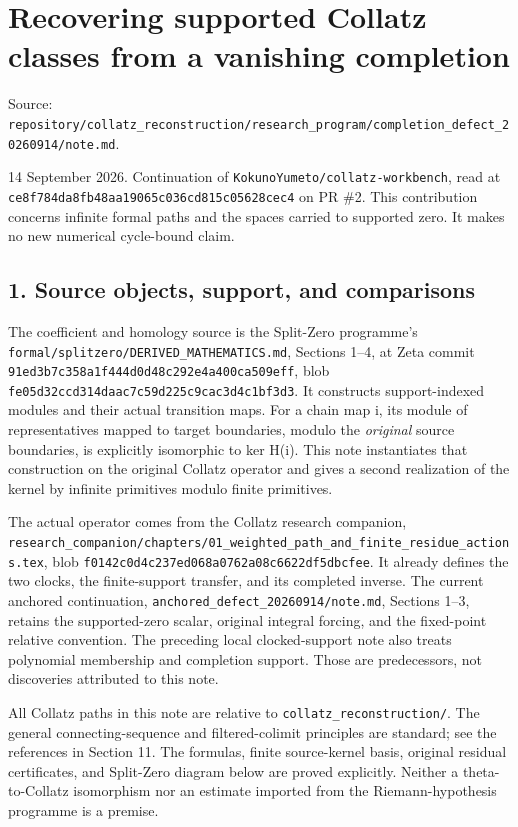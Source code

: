 \chapter{Recovering supported Collatz classes from a vanishing
completion}
{\small\sffamily Source: \nolinkurl{repository/collatz_reconstruction/research_program/completion_defect_20260914/note.md}.\par}


14 September 2026. Continuation of
\nolinkurl{KokunoYumeto/collatz-workbench}, read at
\nolinkurl{ce8f784da8fb48aa19065c036cd815c05628cec4} on PR \#2. This
contribution concerns infinite formal paths and the spaces carried to
supported zero. It makes no new numerical cycle-bound claim.

\section{1. Source objects, support, and comparisons}

The coefficient and homology source is the Split-Zero programme's
\nolinkurl{formal/splitzero/DERIVED_MATHEMATICS.md}, Sections 1--4, at
Zeta commit \nolinkurl{91ed3b7c358a1f444d0d48c292e4a400ca509eff}, blob
\nolinkurl{fe05d32ccd314daac7c59d225c9cac3d4c1bf3d3}. It constructs
support-indexed modules and their actual transition maps. For a chain
map i, its module of representatives mapped to target boundaries, modulo
the \emph{original} source boundaries, is explicitly isomorphic to ker
H(i). This note instantiates that construction on the original Collatz
operator and gives a second realization of the kernel by infinite
primitives modulo finite primitives.

The actual operator comes from the Collatz research companion,
\nolinkurl{research_companion/chapters/01_weighted_path_and_finite_residue_actions.tex},
blob \nolinkurl{f0142c0d4c237ed068a0762a08c6622df5dbcfee}. It already
defines the two clocks, the finite-support transfer, and its completed
inverse. The current anchored continuation,
\nolinkurl{anchored_defect_20260914/note.md}, Sections 1--3, retains the
supported-zero scalar, original integral forcing, and the fixed-point
relative convention. The preceding local clocked-support note also
treats polynomial membership and completion support. Those are
predecessors, not discoveries attributed to this note.

All Collatz paths in this note are relative to
\nolinkurl{collatz_reconstruction/}. The general connecting-sequence and
filtered-colimit principles are standard; see the references in Section
11. The formulas, finite source-kernel basis, original residual
certificates, and Split-Zero diagram below are proved explicitly.
Neither a theta-to-Collatz isomorphism nor an estimate imported from the
Riemann-hypothesis programme is a premise.

